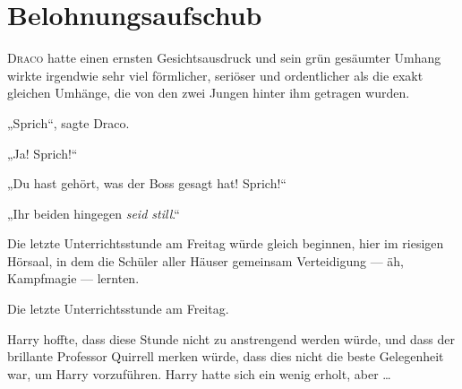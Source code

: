 \chapter{Belohnungsaufschub}


\lettrine{D}{raco} hatte einen ernsten Gesichtsausdruck und sein grün gesäumter Umhang wirkte irgendwie sehr viel förmlicher, seriöser und ordentlicher als die exakt gleichen Umhänge, die von den zwei Jungen hinter ihm getragen wurden.

„Sprich“, sagte Draco.

„Ja! Sprich!“

„Du hast gehört, was der Boss gesagt hat! Sprich!“

„Ihr beiden hingegen \emph{seid still}.“

Die letzte Unterrichtsstunde am Freitag würde gleich beginnen, hier im riesigen Hörsaal, in dem die Schüler aller Häuser gemeinsam Verteidigung — äh, Kampfmagie — lernten.

Die letzte Unterrichtsstunde am Freitag.

Harry hoffte, dass diese Stunde nicht zu anstrengend werden würde, und dass der brillante Professor Quirrell merken würde, dass dies nicht die beste Gelegenheit war, um Harry vorzuführen. Harry hatte sich ein wenig erholt, aber …

